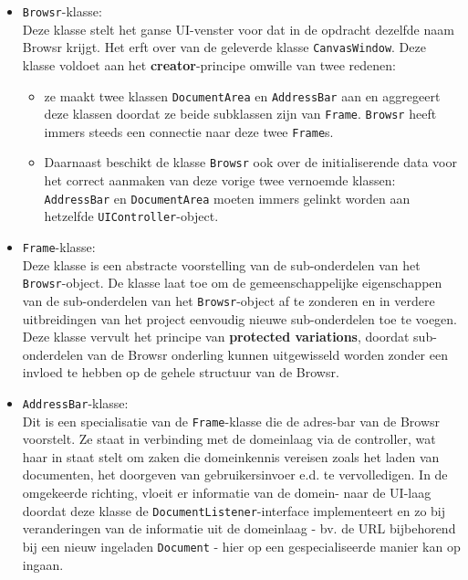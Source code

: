 \documentclass[12pt]{article}
\begin{document}
\begin{itemize}
	\item \texttt{Browsr}-klasse:\\
	Deze klasse stelt het ganse UI-venster voor dat in de opdracht dezelfde naam Browsr krijgt. Het erft over van de geleverde klasse \texttt{CanvasWindow}. Deze klasse voldoet aan het \textbf{creator}-principe omwille van twee redenen:
	\begin{itemize}
		\item ze maakt twee klassen \texttt{DocumentArea} en \texttt{AddressBar} aan en aggregeert deze klassen doordat ze beide subklassen zijn van \texttt{Frame}. \texttt{Browsr} heeft immers steeds een connectie naar deze twee \texttt{Frame}s.
		\item Daarnaast beschikt de klasse \texttt{Browsr} ook over de initialiserende data voor het correct aanmaken van deze vorige twee vernoemde klassen: \texttt{AddressBar} en \texttt{DocumentArea} moeten immers gelinkt worden aan hetzelfde \texttt{UIController}-object.
	\end{itemize}
	 
	 \item \texttt{Frame}-klasse:\\
	 Deze klasse is een abstracte voorstelling van de sub-onderdelen van het \texttt{Browsr}-object. De klasse laat toe om de gemeenschappelijke eigenschappen van de sub-onderdelen van het \texttt{Browsr}-object af te zonderen en in verdere uitbreidingen van het project eenvoudig nieuwe sub-onderdelen toe te voegen.
	 Deze klasse vervult het principe van \textbf{protected variations}, doordat sub-onderdelen van de Browsr onderling kunnen uitgewisseld worden zonder een invloed te hebben op de gehele structuur van de Browsr.
	 
	 \item \texttt{AddressBar}-klasse:\\
	 Dit is een specialisatie van de \texttt{Frame}-klasse die de adres-bar van de Browsr voorstelt. Ze staat in verbinding met de domeinlaag via de controller, wat haar in staat stelt om zaken die domeinkennis vereisen zoals het laden van documenten, het doorgeven van gebruikersinvoer e.d. te vervolledigen. In de omgekeerde richting, vloeit er informatie van de domein- naar de UI-laag doordat deze klasse de \texttt{DocumentListener}-interface implementeert en zo bij veranderingen van de informatie uit de domeinlaag - bv. de URL bijbehorend bij een nieuw ingeladen \texttt{Document} - hier op een gespecialiseerde manier kan op ingaan.
	 

\end{itemize}
\end{document}
